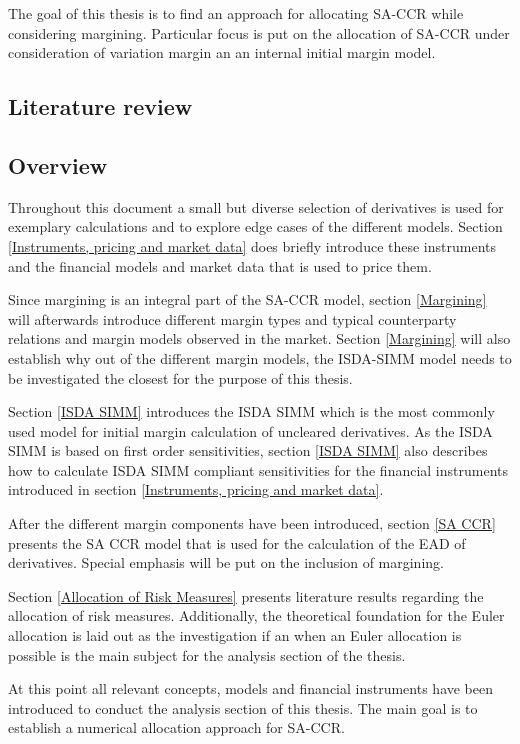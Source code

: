 \documentclass[../Thesis_AHoecherl.tex]{subfiles}
\begin{document}
    The goal of this thesis is to find an approach for allocating SA-CCR while considering margining. Particular focus is put on the allocation of SA-CCR under consideration of variation margin an an internal initial margin model. 
    
    \subsection{Literature review}
    \subsection{Overview}

    Throughout this document a small but diverse selection of derivatives is used for exemplary calculations and to explore edge cases of the different models. Section \ref{Instruments, pricing and market data} does briefly introduce these instruments and the financial models and market data that is used to price them.
    
    Since margining is an integral part of the SA-CCR model, section \ref{Margining} will afterwards introduce different margin types and typical counterparty relations and margin models observed in the market. Section \ref{Margining} will also establish why out of the different margin models, the ISDA-SIMM model needs to be investigated the closest for the purpose of this thesis.

    Section \ref{ISDA SIMM} introduces the ISDA SIMM which is the most commonly used model for initial margin calculation of uncleared derivatives. As the ISDA SIMM is based on first order sensitivities, section \ref{ISDA SIMM} also describes how to calculate \gls{ISDA SIMM} compliant sensitivities for the financial instruments introduced in section \ref{Instruments, pricing and market data}.

    After the different margin components have been introduced, section \ref{SA CCR} presents the SA CCR model that is used for the calculation of the \gls{EAD} of derivatives. Special emphasis will be put on the inclusion of margining.

    Section \ref{Allocation of Risk Measures} presents literature results regarding the allocation of risk measures. Additionally, the theoretical foundation for the Euler allocation is laid out as the investigation if an when an Euler allocation is possible is the main subject for the analysis section of the thesis.

    At this point all relevant concepts, models and financial instruments have been introduced to conduct the analysis section of this thesis. The main goal is to establish a numerical allocation approach for SA-CCR.
\end{document}
